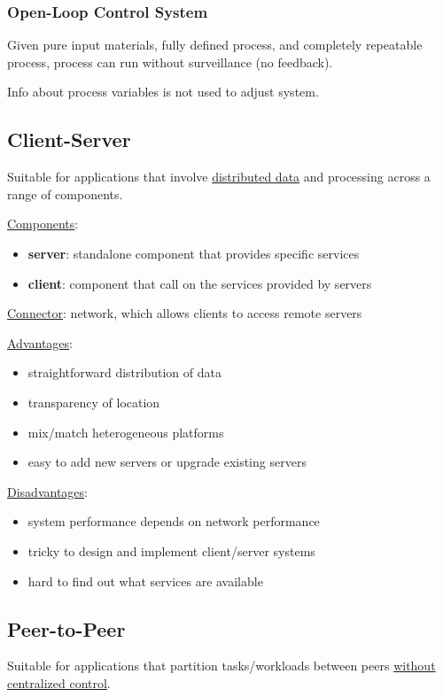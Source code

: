\documentclass[11pt]{article}
\begin{document}
\subsubsection{Open-Loop Control System}
\label{sec:orgeb20d20}
Given pure input materials, fully defined process, and completely
repeatable process, process can run without surveillance (no
feedback).

Info about process variables is not used to adjust system.
\subsection{Client-Server}
\label{sec:org7398212}
Suitable for applications that involve \uline{distributed data} and processing
across a range of components.

\uline{Components}:
\begin{itemize}
\item \textbf{server}: standalone component that provides specific services
\item \textbf{client}: component that call on the services provided by servers
\end{itemize}

\uline{Connector}: network, which allows clients to access remote servers

\uline{Advantages}:
\begin{itemize}
\item straightforward distribution of data
\item transparency of location
\item mix/match heterogeneous platforms
\item easy to add new servers or upgrade existing servers
\end{itemize}

\uline{Disadvantages}:
\begin{itemize}
\item system performance depends on network performance
\item tricky to design and implement client/server systems
\item hard to find out what services are available
\end{itemize}
\subsection{Peer-to-Peer}
\label{sec:org0247f2d}
Suitable for applications that partition tasks/workloads between peers
\uline{without centralized control}.
\end{document}
